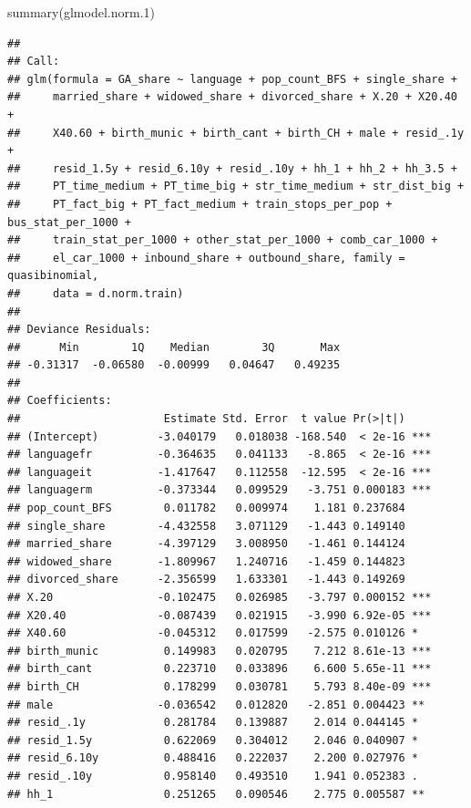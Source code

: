 \documentclass[
]{article}
\newenvironment{Shaded}{\begin{snugshade}}{\end{snugshade}}
\newcommand{\FloatTok}[1]{\textcolor[rgb]{0.00,0.00,0.81}{#1}}
\newcommand{\FunctionTok}[1]{\textcolor[rgb]{0.00,0.00,0.00}{#1}}
\newcommand{\NormalTok}[1]{#1}
\begin{document}
\begin{Shaded}
\begin{Highlighting}[]
\FunctionTok{summary}\NormalTok{(glmodel.norm}\FloatTok{.1}\NormalTok{)}
\end{Highlighting}
\end{Shaded}

\begin{verbatim}
## 
## Call:
## glm(formula = GA_share ~ language + pop_count_BFS + single_share + 
##     married_share + widowed_share + divorced_share + X.20 + X20.40 + 
##     X40.60 + birth_munic + birth_cant + birth_CH + male + resid_.1y + 
##     resid_1.5y + resid_6.10y + resid_.10y + hh_1 + hh_2 + hh_3.5 + 
##     PT_time_medium + PT_time_big + str_time_medium + str_dist_big + 
##     PT_fact_big + PT_fact_medium + train_stops_per_pop + bus_stat_per_1000 + 
##     train_stat_per_1000 + other_stat_per_1000 + comb_car_1000 + 
##     el_car_1000 + inbound_share + outbound_share, family = quasibinomial, 
##     data = d.norm.train)
## 
## Deviance Residuals: 
##      Min        1Q    Median        3Q       Max  
## -0.31317  -0.06580  -0.00999   0.04647   0.49235  
## 
## Coefficients:
##                      Estimate Std. Error  t value Pr(>|t|)    
## (Intercept)         -3.040179   0.018038 -168.540  < 2e-16 ***
## languagefr          -0.364635   0.041133   -8.865  < 2e-16 ***
## languageit          -1.417647   0.112558  -12.595  < 2e-16 ***
## languagerm          -0.373344   0.099529   -3.751 0.000183 ***
## pop_count_BFS        0.011782   0.009974    1.181 0.237684    
## single_share        -4.432558   3.071129   -1.443 0.149140    
## married_share       -4.397129   3.008950   -1.461 0.144124    
## widowed_share       -1.809967   1.240716   -1.459 0.144823    
## divorced_share      -2.356599   1.633301   -1.443 0.149269    
## X.20                -0.102475   0.026985   -3.797 0.000152 ***
## X20.40              -0.087439   0.021915   -3.990 6.92e-05 ***
## X40.60              -0.045312   0.017599   -2.575 0.010126 *  
## birth_munic          0.149983   0.020795    7.212 8.61e-13 ***
## birth_cant           0.223710   0.033896    6.600 5.65e-11 ***
## birth_CH             0.178299   0.030781    5.793 8.40e-09 ***
## male                -0.036542   0.012820   -2.851 0.004423 ** 
## resid_.1y            0.281784   0.139887    2.014 0.044145 *  
## resid_1.5y           0.622069   0.304012    2.046 0.040907 *  
## resid_6.10y          0.488416   0.222037    2.200 0.027976 *  
## resid_.10y           0.958140   0.493510    1.941 0.052383 .  
## hh_1                 0.251265   0.090546    2.775 0.005587 ** 

\end{verbatim}
\end{document}

